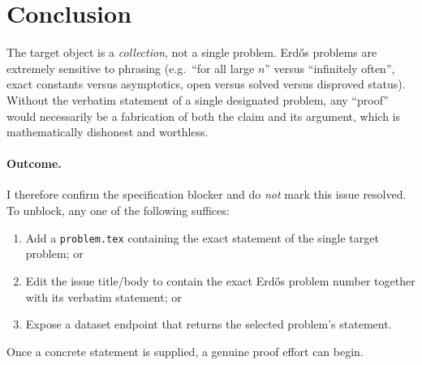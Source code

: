 \documentclass[12pt]{article}
\begin{document}
\section*{Conclusion}

The target object is a \emph{collection}, not a single problem. Erd\H{o}s
problems are extremely sensitive to phrasing (e.g.\ ``for all large $n$''
versus ``infinitely often'', exact constants versus asymptotics, open
versus solved versus disproved status). Without the verbatim statement of a
single designated problem, any ``proof'' would necessarily be a fabrication
of both the claim and its argument, which is mathematically dishonest and
worthless.

\paragraph{Outcome.} I therefore confirm the specification blocker and do
\emph{not} mark this issue resolved. To unblock, any one of the following
suffices:
\begin{enumerate}
\item Add a \texttt{problem.tex} containing the exact statement of the
single target problem; or
\item Edit the issue title/body to contain the exact Erd\H{o}s problem
number together with its verbatim statement; or
\item Expose a dataset endpoint that returns the selected problem's
statement.
\end{enumerate}
Once a concrete statement is supplied, a genuine proof effort can begin.
\end{document}
